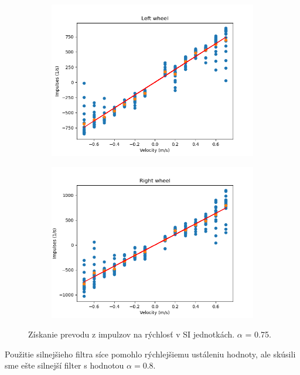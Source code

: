 \begin{figure}[!htbp]
	\begin{subfigure}{0.5\textwidth}
		\includegraphics[width=\textwidth]{img/lw_075250.png}
	\end{subfigure}
	\hfill
	\begin{subfigure}{0.5\textwidth}
		\includegraphics[width=\textwidth]{img/rw_075250.png}
	\end{subfigure}
	\caption{Získanie prevodu z impulzov na rýchlosť v SI jednotkách. \(\alpha\) = 0.75.}
	\label{fig:rw_lw_075250}
\end{figure}

Použitie silnejšieho filtra síce pomohlo rýchlejšiemu ustáleniu hodnoty, ale skúsili sme ešte silnejší filter s hodnotou \(\alpha = 0.8\).


